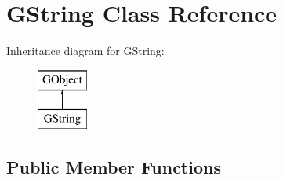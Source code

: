 \hypertarget{classGString}{}\section{G\+String Class Reference}
\label{classGString}
Inheritance diagram for G\+String\+:\begin{figure}[H]
\begin{center}
\leavevmode
\includegraphics[height=2.000000cm]{classGString}
\end{center}
\end{figure}
\subsection*{Public Member Functions}
